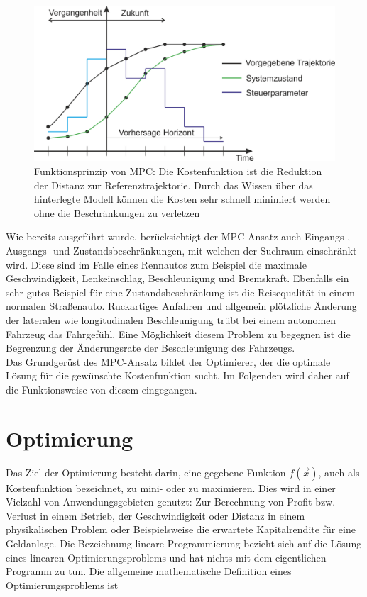 \documentclass{like}
\begin{document}
\begin{figure}[ht!]
	\centering
	\includegraphics[width=400pt]{Abbildungen/mpcParadigm.png}
	\caption{Funktionsprinzip von \ac{MPC}: Die Kostenfunktion ist die Reduktion der Distanz zur Referenztrajektorie. Durch das Wissen über das hinterlegte Modell können die Kosten sehr schnell minimiert werden ohne die Beschränkungen zu verletzen}
	\label{fig:mpcTheory}
\end{figure}

Wie bereits ausgeführt wurde, berücksichtigt der \ac{MPC}-Ansatz auch Eingangs-, Ausgangs- und Zustandsbeschränkungen, mit welchen der Suchraum einschränkt wird. Diese sind im Falle eines Rennautos zum Beispiel die maximale Geschwindigkeit, Lenkeinschlag, Beschleunigung und Bremskraft. Ebenfalls ein sehr gutes Beispiel für eine Zustandsbeschränkung ist die Reisequalität in einem normalen Straßenauto. Ruckartiges Anfahren und allgemein plötzliche Änderung der lateralen wie longitudinalen Beschleunigung trübt bei einem autonomen Fahrzeug das Fahrgefühl. Eine Möglichkeit diesem Problem zu begegnen ist die Begrenzung der Änderungsrate der Beschleunigung des Fahrzeugs.\\

Das Grundgerüst des \ac{MPC}-Ansatz bildet der Optimierer, der die optimale Lösung für die gewünschte Kostenfunktion sucht. Im Folgenden wird daher auf die Funktionsweise von diesem eingegangen.


\section{Optimierung}
Das Ziel der Optimierung besteht darin, eine gegebene Funktion \(f(\vec{x})\), auch als Kostenfunktion bezeichnet, zu mini- oder zu maximieren. 
Dies wird in einer Vielzahl von Anwendungsgebieten genutzt:
Zur Berechnung von Profit bzw. Verlust in einem Betrieb, der Geschwindigkeit oder Distanz in einem physikalischen Problem oder Beispielsweise die erwartete Kapitalrendite für eine Geldanlage.  
Die Bezeichnung lineare Programmierung bezieht sich auf die Lösung eines linearen  Optimierungsproblems und hat nichts mit dem eigentlichen Programm zu tun. 
Die allgemeine mathematische Definition eines Optimierungsproblems ist
\end{document}
